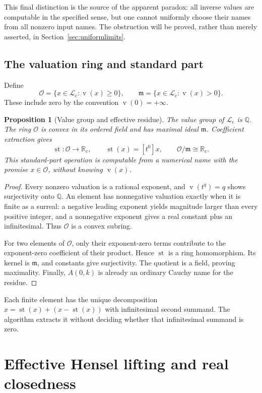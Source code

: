 \documentclass[11pt,letterpaper]{article}
\numberwithin{equation}{section}
\newtheorem{proposition}[theorem]{Proposition}
\theoremstyle{definition}
\theoremstyle{remark}
\newcommand{\Rc}{\mathbb R_{\mathrm c}}
\newcommand{\Lc}{\mathcal L_{\mathrm c}}
\newcommand{\Q}{\mathbb Q}
\newcommand{\st}{\operatorname{st}}
\newcommand{\val}{\operatorname{v}}
\newcommand{\coef}[2]{[t^{#1}]#2}
\newcommand{\Oh}{\mathcal O}
\newcommand{\mh}{\mathfrak m}
\begin{document}
This final distinction is the source of the apparent paradox: all inverse
values are computable in the specified sense, but one cannot uniformly
choose their names from all nonzero input names. The obstruction will be
proved, rather than merely asserted, in Section~\ref{sec:uniformlimits}.

\subsection{The valuation ring and standard part}

Define
\[
 \Oh=\{x\in\Lc:\val(x)\ge0\},\qquad
 \mh=\{x\in\Lc:\val(x)>0\}.
\]
These include zero by the convention $\val(0)=+\infty$.

\begin{proposition}[Value group and effective residue]
\label{prop:residue}
The value group of $\Lc$ is $\Q$. The ring $\Oh$ is convex in its ordered
field and has maximal ideal $\mh$. Coefficient extraction gives
\[
 \st:\Oh\longrightarrow\Rc,\qquad \st(x)=\coef0x,
 \qquad \Oh/\mh\cong\Rc.
\]
This standard-part operation is computable from a numerical name with the
promise $x\in\Oh$, without knowing $\val(x)$.
\end{proposition}
\begin{proof}
Every nonzero valuation is a rational exponent, and $\val(t^q)=q$ shows
surjectivity onto $\Q$. An element has nonnegative valuation exactly when
it is finite as a surreal: a negative leading exponent yields magnitude
larger than every positive integer, and a nonnegative exponent gives a real
constant plus an infinitesimal. Thus $\Oh$ is a convex subring.

For two elements of $\Oh$, only their exponent-zero terms contribute to
the exponent-zero coefficient of their product. Hence $\st$ is a ring
homomorphism. Its kernel is $\mh$, and constants give surjectivity. The
quotient is a field, proving maximality. Finally, $A(0,k)$ is already an
ordinary Cauchy name for the residue.
\end{proof}

Each finite element has the unique decomposition
$x=\st(x)+(x-\st(x))$ with infinitesimal second summand. The algorithm
extracts it without deciding whether that infinitesimal summand is zero.

\section{Effective Hensel lifting and real closedness}
\label{sec:realclosed}
\end{document}
